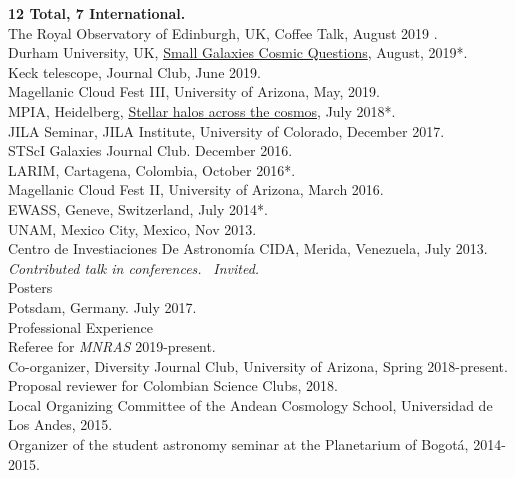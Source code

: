 \documentclass[UTF8]{article}
\begin{document}
\indent \indent \textbf{12 Total, 7 International.}\\
\indent\indent The Royal Observatory of Edinburgh, UK, Coffee Talk, August 2019 \dag.\\
\indent\indent Durham University, UK, \href{http://astro.dur.ac.uk/cosmodwarfs/}{Small Galaxies Cosmic Questions}, August, 2019*.\\
\indent\indent Keck telescope, Journal Club, June 2019.\\
\indent\indent Magellanic Cloud Fest III, University of Arizona, May, 2019.\\
\indent\indent MPIA, Heidelberg, \href{http://www.mpia.de/homes/stellarhalos2018-loc/sh2018/index.html}{Stellar halos across the cosmos}, July 2018*.\\
\indent\indent JILA Seminar, JILA Institute, University of Colorado, December 2017.\\
\indent\indent STScI Galaxies Journal Club. December 2016.\\
\indent\indent LARIM, Cartagena, Colombia, October 2016*.\\
\indent\indent Magellanic Cloud Fest II, University of Arizona, March 2016.\\
\indent\indent EWASS, Geneve, Switzerland, July 2014*.\\
\indent\indent UNAM, Mexico City, Mexico, Nov 2013. \\
\indent\indent Centro de Investiaciones De Astronom\'ia CIDA, Merida, Venezuela, July 2013.\\

\indent\indent * \textit{Contributed talk in conferences.}
\indent\indent\ \dag \textit{Invited.} \\

{\Large Posters}\\

\indent\indent Potsdam, Germany. July 2017.\\


{\Large {Professional Experience}}\\




\indent\indent Referee for \textit{MNRAS} 2019-present.\\ 
\indent\indent Co-organizer, Diversity Journal Club, University of Arizona, Spring 2018-present.\\
\indent\indent Proposal reviewer for Colombian Science Clubs, 2018.\\
\indent\indent Local Organizing Committee of the Andean Cosmology School, Universidad de Los Andes, 2015.\\
\indent\indent Organizer of the student astronomy seminar at the Planetarium of Bogot\'a, 2014-2015.\\
\end{document}
